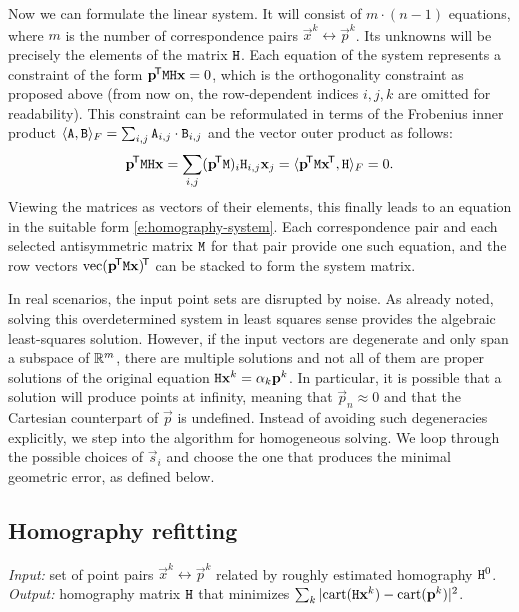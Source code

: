 Now we can formulate the linear system.
It will consist of $m \cdot (n - 1)$ equations, where $m$ is the number of correspondence pairs $\vec x^k \leftrightarrow \vec p^k$.
Its unknowns will be precisely the elements of the matrix $\mathtt{H}$.
Each equation of the system represents a constraint of the form $\mathbf{p}^{\!\mathsf{T}} \mathtt{M} \mathtt{H} \mathbf{x} = 0$, which is the orthogonality constraint as proposed above (from now on, the row-dependent indices $i, j, k$ are omitted for readability).
This constraint can be reformulated in terms of the Frobenius inner product $\langle \mathtt{A}, \mathtt{B} \rangle_F = \sum_{i, j} \mathtt{A}_{i, j} \cdot \mathtt{B}_{i, j}$ and the vector outer product as follows:
$$\mathbf{p}^{\!\mathsf{T}} \mathtt{M} \mathtt{H} \mathbf{x} = \sum_{i, j} (\mathbf{p}^{\!\mathsf{T}} \mathtt{M})_i \mathtt{H}_{i, j} \mathbf{x}_j = \langle \mathbf{p}^{\!\mathsf{T}} \mathtt{M} \mathbf{x}^{\!\mathsf{T}}, \mathtt{H} \rangle_F = 0.$$
Viewing the matrices as vectors of their elements, this finally leads to an equation in the suitable form \eqref{e:homography-system}.
Each correspondence pair and each selected antisymmetric matrix $\mathtt{M}$ for that pair provide one such equation, and the row vectors $\mathrm{vec} ({\mathbf{p}}^{\!\mathsf{T}} \mathtt{M} \mathbf{x})^{\!\mathsf{T}}$ can be stacked to form the system matrix.

In real scenarios, the input point sets are disrupted by noise.
As already noted, solving this overdetermined system in least squares sense provides the algebraic least-squares solution.
However, if the input vectors are degenerate and only span a subspace of $\mathbb{R}^m$, there are multiple solutions and not all of them are proper solutions of the original equation $\mathtt{H} \mathbf{x}^k = \alpha_k \mathbf{p}^k$.
In particular, it is possible that a solution will produce points at infinity, meaning that $\vec p_n \approx 0$ and that the Cartesian counterpart of $\vec p$ is undefined.
Instead of avoiding such degeneracies explicitly, we step into the algorithm for homogeneous solving.
We loop through the possible choices of $\vec s_i$ and choose the one that produces the minimal geometric error, as defined below.

\subsection{Homography refitting} 

\textit{Input:} set of point pairs $\vec x^k \leftrightarrow \vec p^k$ related by roughly estimated homography $\mathtt{H}^0$.\\
\textit{Output:} homography matrix $\mathtt{H}$ that minimizes $\sum_k |\mathrm{cart}(\mathtt{H} \mathbf{x}^k) - \mathrm{cart}(\mathbf{p}^k)|^2$.\\

